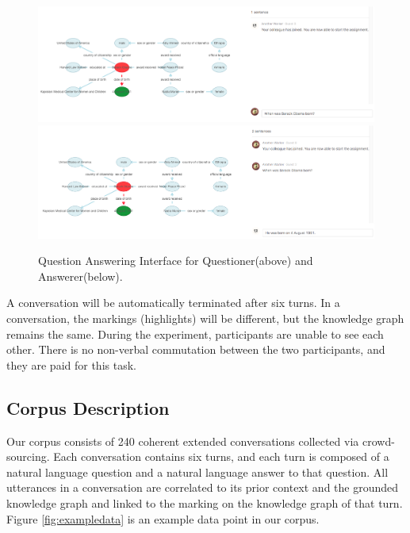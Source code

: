 \documentclass[bsc,frontabs,twoside,singlespacing,parskip,deptreport]{infthesis}     %
\begin{document}
\begin{figure}[h]
    \centering
    \includegraphics[width=1\textwidth]{q1.png}
    \includegraphics[width=1\textwidth]{a1.png}
    \caption{Question Answering Interface for Questioner(above) and Answerer(below).}
    \label{fig:kgjson}
\end{figure}



A conversation will be automatically terminated after six turns. In a conversation, the markings (highlights) will be different, but the knowledge graph remains the same. During the experiment, participants are unable to see each other. There is no non-verbal commutation between the two participants, and they are paid for this task.

\subsection{Corpus Description}

Our corpus consists of 240 coherent extended conversations collected via crowd-sourcing. Each conversation contains six turns, and each turn is composed of a natural language question and a natural language answer to that question. All utterances in a conversation are correlated to its prior context and the grounded knowledge graph and linked to the marking on the knowledge graph of that turn. Figure \ref{fig:exampledata} is an example data point in our corpus.
\end{document}
